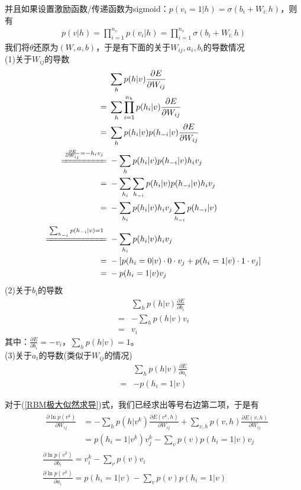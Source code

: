             并且如果设置激励函数/传递函数为sigmoid：$p(v_i=1|h) = \sigma(b_i +W_{i:}h)$，则有
            \begin{align*}
            p(v|h) = \prod_{i=1}^{n_v}p(v_i|h)=  \prod_{i=1}^{n_v}\sigma(b_i +W_{i:}h)
            \end{align*}
            我们将$\theta$还原为$(W,a,b)$，于是有下面的关于$W_{ij},a_i,b_i$的导数情况\\
            (1)关于$W_{ij}$的导数
            \begin{align*}
            &\sum_hp(h|v) \frac{\partial E}{\partial W_{ij}}\\
            ={}& \sum_h\prod_{i=1}^{n_h}p(h_i|v)\frac{\partial E}{\partial W_{ij}}\\
            ={}& \sum_h p(h_i|v)p(h_{-i}|v)\frac{\partial E}{\partial W_{ij}}\\
            \xlongequal{\frac{\partial E}{\partial W_{ij}} = -h_iv_j} {}&-\sum_hp(h_i|v)p(h_{-i}|v)h_iv_j\\
            ={}&-\sum_{h_i}\sum_{h_{-i}}p(h_i|v)p(h_{-i}|v)h_iv_j\\
            ={}&-\sum_{h_i}p(h_i|v)h_iv_j\sum_{h_{-i}} p(h_{-i}|v)\\
            \xlongequal{\sum_{h_{-i}}p(h_{-i}|v) = 1} {}& -\sum_{h_i}p(h_i|v)h_iv_j\\
            ={}&-\left[ p(h_i=0|v)\cdot 0\cdot v_j+p(h_i = 1|v) \cdot 1\cdot v_j \right]\\
            ={}& -p(h_i=1|v)v_j
            \end{align*}
            (2)关于$b_i$的导数
            \begin{align*}
            & \sum_hp(h|v)\frac{\partial E}{\partial b_i}\\
            ={}& -\sum_hp(h|v)v_i\\
            ={}& v_i
            \end{align*}
            其中：$\frac{\partial E}{\partial b_i} = -v_i$，$\sum_h p (h|v)=1$。\\
            (3)关于$a_i$的导数(类似于$W_{ij}$的情况)
            \begin{align*}
            &\sum_hp(h|v) \frac{\partial E}{\partial a_i}\\
            ={}&-p(h_i=1|v)
            \end{align*}
            \par
            对于(\ref{RBM极大似然求导})式，我们已经求出等号右边第二项，于是有
            \begin{align*}
            & \begin{aligned}
            \frac{\partial \ln p(v^k)}{\partial W_{ij}}
            & = -\sum_hp(h|v^k)\frac{\partial E(v^k,h)}{\partial W_{ij}}+ \sum_{v,h} p(v,h)\frac{\partial E(v,h)}{\partial W_{ij}}\\
            & =p(h_i=1|v^k)v_j^k - \sum_vp(v)p(h_i = 1|v)v_j
            \end{aligned}\\
            & \frac{\partial \ln p(v^k)}{\partial b_i} = v_i^k- \sum_vp(v)v_i\\
            & \frac{\partial \ln p(v^k)}{\partial a_i} = p(h_i=1|v) - \sum_vp(v)p(h_i=1|v)
            \end{align*}
